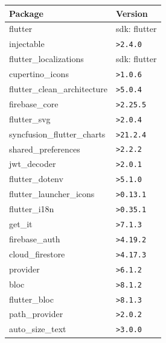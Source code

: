 \begin{table}[h!]
    \centering
    \begin{tabular}{|m{}|m{}|}
        \hline
        \textbf{Package}                 & \textbf{Version} \\ \hline
        flutter                          & sdk: flutter     \\ \hline
        injectable                       & \texttt{>2.4.0}  \\ \hline
        flutter\_localizations           & sdk: flutter     \\ \hline
        cupertino\_icons                 & \texttt{>1.0.6}  \\ \hline
        flutter\_clean\_architecture     & \texttt{>5.0.4}  \\ \hline
        firebase\_core                   & \texttt{>2.25.5} \\ \hline
        flutter\_svg                     & \texttt{>2.0.4}  \\ \hline
        syncfusion\_flutter\_charts      & \texttt{>21.2.4} \\ \hline
        shared\_preferences              & \texttt{>2.2.2}  \\ \hline
        jwt\_decoder                     & \texttt{>2.0.1}  \\ \hline
        flutter\_dotenv                  & \texttt{>5.1.0}  \\ \hline
        flutter\_launcher\_icons         & \texttt{>0.13.1} \\ \hline
        flutter\_i18n                    & \texttt{>0.35.1} \\ \hline
        get\_it                          & \texttt{>7.1.3}  \\ \hline
        firebase\_auth                   & \texttt{>4.19.2} \\ \hline
        cloud\_firestore                 & \texttt{>4.17.3} \\ \hline
        provider                         & \texttt{>6.1.2}  \\ \hline
        bloc                             & \texttt{>8.1.2}  \\ \hline
        flutter\_bloc                    & \texttt{>8.1.3}  \\ \hline
        path\_provider                   & \texttt{>2.0.2}  \\ \hline
        auto\_size\_text                 & \texttt{>3.0.0}  \\ \hline

\end{tabular}
\end{table}

